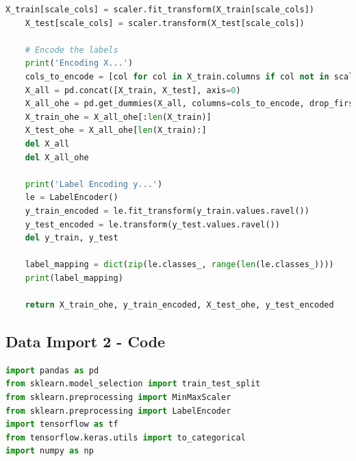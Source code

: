 \begin{appendices}
\begin{lstlisting}[language=Python]
    X_train[scale_cols] = scaler.fit_transform(X_train[scale_cols])
    X_test[scale_cols] = scaler.transform(X_test[scale_cols])

    # Encode the labels
    print('Encoding X...')
    cols_to_encode = [col for col in X_train.columns if col not in scale_cols]
    X_all = pd.concat([X_train, X_test], axis=0)
    X_all_ohe = pd.get_dummies(X_all, columns=cols_to_encode, drop_first=True, dtype=np.uint8)
    X_train_ohe = X_all_ohe[:len(X_train)]
    X_test_ohe = X_all_ohe[len(X_train):]
    del X_all
    del X_all_ohe

    print('Label Encoding y...')
    le = LabelEncoder()
    y_train_encoded = le.fit_transform(y_train.values.ravel())
    y_test_encoded = le.transform(y_test.values.ravel())
    del y_train, y_test

    label_mapping = dict(zip(le.classes_, range(len(le.classes_))))
    print(label_mapping)

    return X_train_ohe, y_train_encoded, X_test_ohe, y_test_encoded	
\end{lstlisting}

\subsection{Data Import 2 - Code}
\label{appx: Data Import 2 - Code}
\begin{lstlisting}[language=Python]
import pandas as pd
from sklearn.model_selection import train_test_split
from sklearn.preprocessing import MinMaxScaler
from sklearn.preprocessing import LabelEncoder
import tensorflow as tf
from tensorflow.keras.utils import to_categorical
import numpy as np



\end{lstlisting}
\end{appendices}
